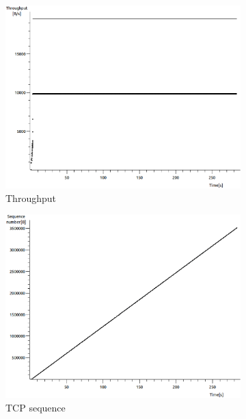 \documentclass[conference,a4paper]{IEEEtran}
\begin{document}
\begin{figure}
 \centering
 \begin{subfigure}[b]{0.2\textwidth}
  \includegraphics[width=\textwidth]{s1-2_thru}
  \caption{Throughput}
 \end{subfigure}
 \begin{subfigure}[b]{0.2\textwidth}
  \includegraphics[width=\textwidth]{s1-2_seq}
  \caption{TCP sequence}
 \end{subfigure}
 \begin{subfigure}[b]{0.2\textwidth}

\end{subfigure}
\end{figure}
\end{document}
